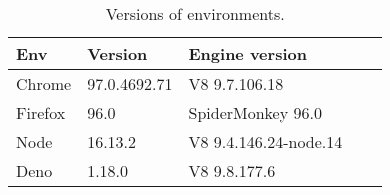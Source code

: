 
\begin{wraptable}{r}{7.5cm}
    \caption{Versions of environments.}
    \label{tab:versions}
    \setlength{\tabcolsep}{0.5em}
    \begin{tabular}{lllll}%
        \hline
        Env     & Version      & Engine version           \\
        \hline
        Chrome  & 97.0.4692.71 & V8 9.7.106.18            \\
        Firefox & 96.0         & SpiderMonkey  96.0       \\
        Node    & 16.13.2      & V8    9.4.146.24-node.14 \\
        Deno    & 1.18.0       & V8      9.8.177.6        \\
        \hline
    \end{tabular}
\end{wraptable}
